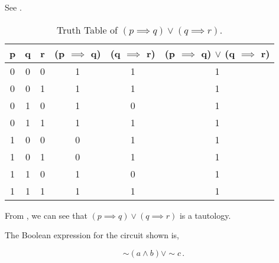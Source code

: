 \begin{subquestions}
\subquestion

\begin{subsubquestions}
	
\subsubquestion

See .

\begin{table}[ht]
	\centering
	\begin{tabular}{|c|c|c|c|c|c|}
		\hline
		p & q & r & (p $\implies$ q) & (q $\implies$ r) & (p $\implies$ q) $\lor$ (q $\implies$ r) \\
		\hline
		0 & 0 & 0 & 1 & 1 & 1 \\
		0 & 0 & 1 & 1 & 1 & 1 \\
		0 & 1 & 0 & 1 & 0 & 1 \\
		0 & 1 & 1 & 1 & 1 & 1 \\
		1 & 0 & 0 & 0 & 1 & 1 \\
		1 & 0 & 1 & 0 & 1 & 1 \\
		1 & 1 & 0 & 1 & 0 & 1 \\
		1 & 1 & 1 & 1 & 1 & 1 \\
		\hline
	\end{tabular}
	\caption{\label{2014:q1:tab:Tab2} Truth Table of $(p \implies q) \lor (q \implies r)$.}
\end{table}


\subsubquestion

From , we can see that $(p \implies q) \lor (q \implies r)$ is a tautology.
\end{subsubquestions}


\subquestion

The Boolean expression for the circuit shown is,

\begin{equation}
	\sim (a \land b) \lor \sim c\,.
\end{equation}



\end{subquestions}
